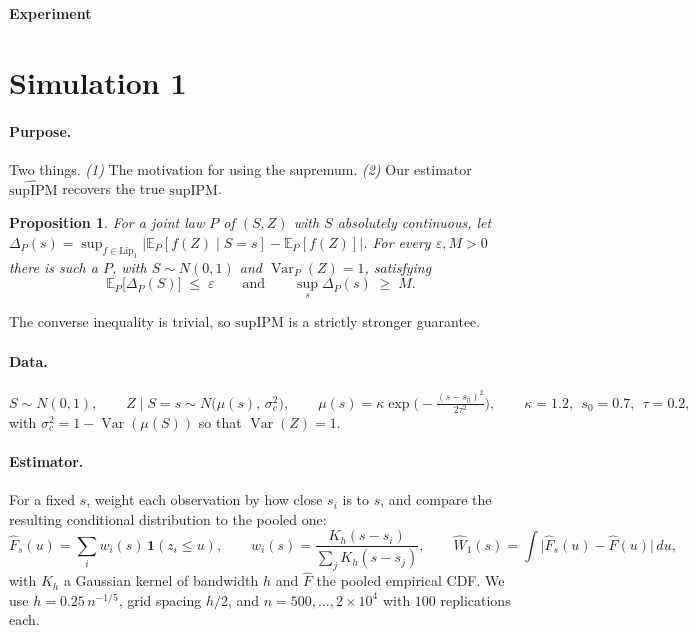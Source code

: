 \documentclass[10pt]{article}
\newtheorem{proposition}{Proposition}
\newcommand{\supIPM}{\mathrm{supIPM}}
\newcommand{\hsupIPM}{\widehat{\supIPM}}
\newcommand{\Wone}{W_1}
\begin{document}
\begin{center}\vspace{-0.5em}
{\large\bfseries Experiment}
\vspace{-0.5em}\end{center}


\section{Simulation 1}

\paragraph{Purpose.} Two things. \emph{(1)} The motivation for using the supremum. \emph{(2)} Our estimator $\hsupIPM$ recovers the true
$\supIPM$.

\begin{proposition}
For a joint law $P$ of $(S,Z)$ with $S$ absolutely continuous, let
$\Delta_P(s) = \sup_{f \in \mathrm{Lip}_1} \big| \mathbb E_P[f(Z) \mid S{=}s] - \mathbb E_P[f(Z)] \big|$.
For every $\varepsilon, M > 0$ there is such a $P$, with $S \sim N(0,1)$ and
$\operatorname{Var}_P(Z) = 1$, satisfying
\[
\mathbb E_P\big[\Delta_P(S)\big] \;\le\; \varepsilon
\qquad\text{and}\qquad
\operatorname*{sup}_{s} \Delta_P(s) \;\ge\; M .
\]
\end{proposition}

\noindent The converse inequality is trivial, so $\supIPM$ is a strictly stronger guarantee.


\paragraph{Data.}
\[
S \sim N(0,1), \qquad Z \mid S{=}s \sim N\!\big(\mu(s),\,\sigma_c^2\big),
\qquad \mu(s) = \kappa\exp\!\Big(\!-\tfrac{(s-s_0)^2}{2\tau^2}\Big),
\qquad \kappa = 1.2,\ \ s_0 = 0.7,\ \ \tau = 0.2,
\]
with $\sigma_c^2 = 1 - \operatorname{Var}(\mu(S))$ so that $\operatorname{Var}(Z) = 1$. 

\paragraph{Estimator.} For a fixed $s$, weight each observation by how close $s_i$ is to $s$, and
compare the resulting conditional distribution to the pooled one:
\[
\widehat F_s(u) = \sum_i w_i(s)\,\mathbf 1(z_i \le u), \qquad
w_i(s) = \frac{K_h(s-s_i)}{\sum_j K_h(s-s_j)}, \qquad
\widehat \Wone(s) = \int \big|\widehat F_s(u) - \widehat F(u)\big|\,du ,
\]
with $K_h$ a Gaussian kernel of bandwidth $h$ and $\widehat F$ the pooled empirical CDF. 
We use $h = 0.25\,n^{-1/5}$, grid spacing $h/2$, and $n = 500,\dots,2{\times}10^4$ with $100$
replications each.
\end{document}
